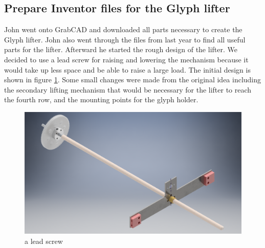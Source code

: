 \documentclass{article}
\begin{document}
\subsection{Prepare Inventor files for the Glyph lifter}
John went onto GrabCAD and downloaded all parts necessary to create the Glyph lifter. John also went through the files from last year to find all useful parts for the lifter. Afterward he started the rough design of the lifter. We decided to use a lead screw for raising and lowering the mechanism because it would take up less space and be able to raise a large load. The initial design is shown in figure \ref{fig:leadscrew}. Some small changes were made from the original idea including the secondary lifting mechanism that would be necessary for the lifter to reach the fourth row, and the mounting points for the glyph holder.
\begin{figure}[h]
    \centering
    \includegraphics[width=.6\textwidth]{02/images/leadscrew.png}
    \caption{a lead screw}
    \label{fig:leadscrew}
\end{figure}
\end{document}
